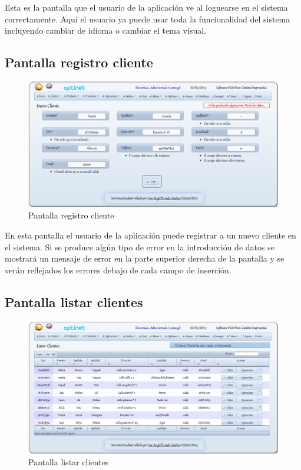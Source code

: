 \documentclass[a4paper,11pt]{book}
\begin{document}
Esta es la pantalla que el usuario de la aplicación ve al loguearse en el sistema correctamente. Aquí el usuario ya puede usar toda la funcionalidad del sistema incluyendo cambiar de idioma o cambiar el tema visual.

\subsection {Pantalla registro cliente}

\begin{figure}[!htb]
  \centering
    \includegraphics[scale=0.35]{capregistrocliente.png}
  \caption{Pantalla registro cliente}
  \label{a}
\end{figure}

En esta pantalla el usuario de la aplicación puede registrar a un nuevo cliente en el sistema. Si se produce algún tipo de error en la introducción de datos se mostrará un mensaje de error en la parte superior derecha de la pantalla y se verán reflejados los errores debajo de cada campo de inserción.

\subsection {Pantalla listar clientes}

\begin{figure}[!htb]
  \centering
    \includegraphics[scale=0.35]{caplistarclientes.png}
  \caption{Pantalla listar clientes}
  \label{a}
\end{figure}
\end{document}

